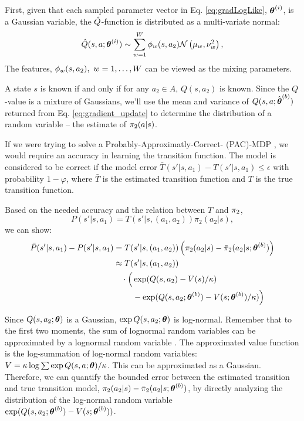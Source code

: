 First, given that each sampled parameter vector in Eq. \ref{eq:gradLogLike}, $\boldsymbol{\mathbb{\theta}}^{(i)}$, is a Gaussian
variable, the $\hat{Q}$-function is distributed as a multi-variate normal:
\[
\hat{Q}(s,a ;\boldsymbol{\mathbb{\theta}}^{(i)}) \sim \sum_{w=1}^W \phi_{w}(s,a_2) \mathcal{N}\left(\mu_w, \nu_w^2\right),
\]
The features, $\phi_{w}(s,a_2),\ w=1,\ldots, W$ can be viewed as the mixing parameters.

A state $s$ is known if and only if for any $a_2 \in A$, $Q(s,a_2)$ is known. Since the $Q$-value is a mixture of
Gaussians, we'll use the mean and variance of $Q(s,a;\hat{\boldsymbol{\mathbb{\theta}}}^{(b)})$ returned from Eq.
\ref{eq:gradient_update} to determine the distribution of a random variable -- the estimate of $\pi_{2}(a|s)$.

If we were trying to solve a Probably-Approximatly-Correct- (PAC)-MDP \cite{Fu-RSS-14}, we would require an accuracy in
learning the transition function. The model is considered to be correct if the model error $\bar T(s'|s,a_1) -
T(s'|s,a_1) \le \epsilon$ with probability $1-\varphi$, where $\bar T$ is the estimated transition function and $T$ is
the true transition function.

Based on the needed accuracy and the relation between $T$ and $\pi_{2}$,
\[
P(s'|s,a_1) = T(s'|s,(a_1,a_2))\pi_2(a_2|s),
\]
we can show:
\begin{align*}
\bar P(s'|s,a_1)  -P(s'|s,a_1)
& = T(s'|s,(a_1,a_2))\left( \pi_2(a_2|s) - \bar \pi_2(a_2|s;\boldsymbol{\mathbb{\theta}}^{(b)})
\right)\\
& \approx T(s'|s,(a_1,a_2)) \\
& \quad \cdot \Big(\exp(Q(s,a_2)-V(s)/\kappa) \\
& \qquad\ - \exp(Q(s,a_2;\boldsymbol{\mathbb{\theta}}^{(b)})-V(s;\boldsymbol{\mathbb{\theta}}^{(b)})/\kappa) \Big)
\end{align*}

Since $Q(s,a_2;\boldsymbol{\mathbb{\theta}})$ is a Gaussian, $\exp Q(s,a_2;\boldsymbol{\mathbb{\theta}})$ is log-normal. Remember that to the first two
moments, the sum of lognormal random variables can be approximated by a lognormal random variable \cite{fenton1960sum}.
The approximated value function is the log-summation of log-normal random variables: ${V =\kappa \log \sum \exp
Q(s,a;\boldsymbol{\mathbb{\theta}})/\kappa}$. This can be approximated as a Gaussian. Therefore, we can quantify the bounded error between
the estimated transition and true transition model, $\pi_2(a_2|s) - \bar \pi_2(a_2|s;\boldsymbol{\mathbb{\theta}}^{(b)})$,  by directly
analyzing the distribution of the log-normal random variable\\
{\(\exp(Q(s,a_2;\boldsymbol{\mathbb{\theta}}^{(b)})-V(s;\boldsymbol{\mathbb{\theta}}^{(b)}))\)}.

